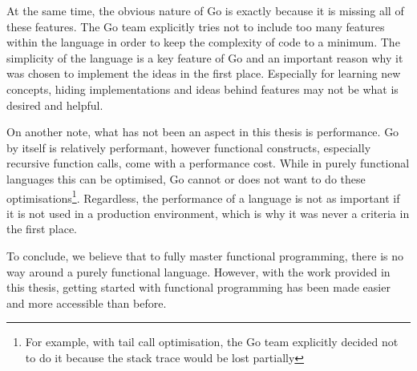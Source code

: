 At the same time, the obvious nature of Go is exactly because it is missing all
of these features. The Go team explicitly tries not to include too many features within
the language in order to keep the complexity of code to a minimum\autocite{go-feature}.
The simplicity of the language is a key feature of Go and an important reason why it was
chosen to implement the ideas in the first place.
Especially for learning new concepts, hiding implementations and ideas behind features
may not be what is desired and helpful.

On another note, what has not been an aspect in this thesis is
performance. Go by itself is relatively performant, however functional constructs, especially
recursive function calls, come with a performance cost. While in purely functional languages
this can be optimised, Go cannot or does not want to do these optimisations\footnote{For example,
with tail call optimisation, the Go team explicitly decided not to do it because the stack trace
would be lost partially}. Regardless, the performance of a language is not as important if it
is not used in a production environment, which is why it was never a criteria in the first place.

To conclude, we believe that to fully master functional programming, there is no way around a
purely functional language. However, with the work provided in this thesis, getting started with
functional programming has been made easier and more accessible than before.
